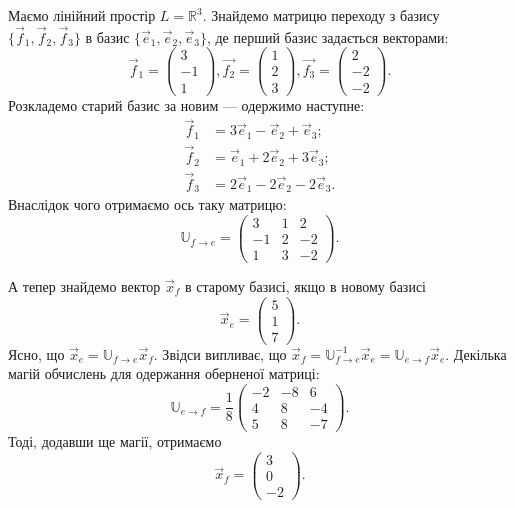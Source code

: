 \documentclass{math_library}
\begin{document}
\begin{example} Маємо лінійний простір $L = \mathbb{R}^3$. Знайдемо матрицю переходу з базису $\{\vec{f}_1,\vec{f}_2,\vec{f}_3\}$ в базис $\{\vec{e}_1,\vec{e}_2, \vec{e}_3\}$, де перший базис задається векторами:
\[
\vec{f}_1 = \begin{pmatrix}
3 \\ -1 \\ 1
\end{pmatrix}, \vec{f_2} = \begin{pmatrix}
1 \\ 2 \\ 3
\end{pmatrix}, \vec{f_3} = \begin{pmatrix}
2 \\ -2 \\ -2
\end{pmatrix}.
\]
Розкладемо старий базис за новим --- одержимо наступне:
\begin{align*}
\vec{f}_1 & = 3\vec{e}_1 -\vec{e}_2 + \vec{e}_3;\\
\vec{f}_2 & = \vec{e}_1 +2\vec{e}_2 + 3\vec{e}_3;\\
\vec{f}_3 & = 2\vec{e}_1 -2\vec{e}_2 -2\vec{e}_3.
\end{align*}
Внаслідок чого отримаємо ось таку матрицю:
\[
\mathbb{U}_{f \to e} = \begin{pmatrix}
3 & 1 & 2 \\
-1 & 2 & -2 \\
1 & 3 & -2
\end{pmatrix}.
\]
\end{example}

\begin{example}
А тепер знайдемо вектор $\vec{x}_f$ в старому базисі, якщо в новому базисі 
\[
\vec{x}_e = \begin{pmatrix}
 5 \\ 1 \\ 7
\end{pmatrix}.
\]
Ясно, що $\vec{x}_e = \mathbb{U}_{f \to e}\vec{x}_f$. Звідси випливає, що $\vec{x}_f = \mathbb{U}^{-1}_{f \to e} \vec{x}_e = \mathbb{U}_{e \to f} \vec{x}_e$. Декілька магій обчислень для одержання оберненої матриці:
\[
\mathbb{U}_{e \to f} = \displaystyle \frac{1}{8} \begin{pmatrix}
-2 & -8 & 6 \\
4 & 8 & -4 \\
5 & 8 & -7
\end{pmatrix}.
\]
Тоді, додавши ще магії, отримаємо 
\[
\vec{x}_f = \begin{pmatrix}
3 \\ 0 \\ -2
\end{pmatrix}.
\]
\end{example}
\end{document}
